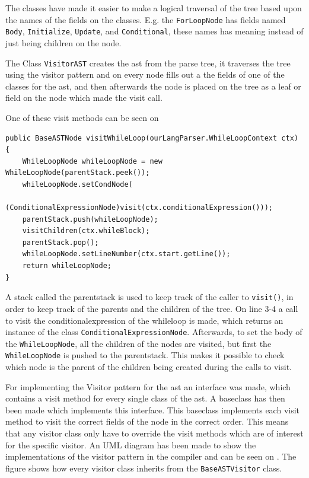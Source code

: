 The classes have made it easier to make a logical traversal of the tree based upon the names of the fields on the classes.
E.g. the \texttt{ForLoopNode} has fields named \texttt{Body}, \texttt{Initialize}, \texttt{Update}, and \texttt{Conditional}, these names has meaning instead of just being children on the node.

The Class \texttt{VisitorAST} creates the \acrshort{ast} from the parse tree, it traverses the tree using the visitor pattern and on every node fills out a the fields of one of the classes for the \acrshort{ast}, and then afterwards the node is placed on the tree as a leaf or field on the node which made the visit call.

One of these visit methods can be seen on 

\begin{lstlisting}[caption=The Visit Method for WhileLoopNode,frame=tlrb,label={lst:VisitorASTCode}]
public BaseASTNode visitWhileLoop(ourLangParser.WhileLoopContext ctx) {
    WhileLoopNode whileLoopNode = new WhileLoopNode(parentStack.peek());
    whileLoopNode.setCondNode(
    	(ConditionalExpressionNode)visit(ctx.conditionalExpression()));
    parentStack.push(whileLoopNode);
    visitChildren(ctx.whileBlock);
    parentStack.pop();
    whileLoopNode.setLineNumber(ctx.start.getLine());
    return whileLoopNode;
}
\end{lstlisting}
A stack called the parentstack is used to keep track of the caller to \texttt{visit()}, in order to keep track of the parents and the children of the tree.
On line 3-4 a call to visit the conditionalexpression of the whileloop is made, which returns an instance of the class \texttt{ConditionalExpressionNode}.
Afterwards, to set the body of the \texttt{WhileLoopNode}, all the children of the nodes are visited, but first the \texttt{WhileLoopNode} is pushed to the parentstack.
This makes it possible to check which node is the parent of the children being created during the calls to visit.

For implementing the Visitor pattern for the \acrshort{ast} an interface was made, which contains a visit method for every single class of the \acrshort{ast}.
A baseclass has then been made which implements this interface.
This baseclass implements each visit method to visit the correct fields of the node in the correct order.
This means that any visitor class only have to override the visit methods which are of interest for the specific visitor.
An UML diagram has been made to show the implementations of the visitor pattern in the compiler and can be seen on .
The figure shows how every visitor class inherits from the \texttt{BaseASTVisitor} class.


